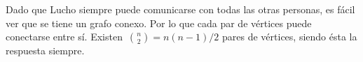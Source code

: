 
Dado que Lucho siempre puede comunicarse con todas las otras personas, es fácil ver
que se tiene un grafo conexo. Por lo que cada par de vértices puede conectarse entre
sí. Existen~${n \choose 2} = n(n - 1) / 2$ pares de vértices, siendo ésta la
respuesta siempre.

